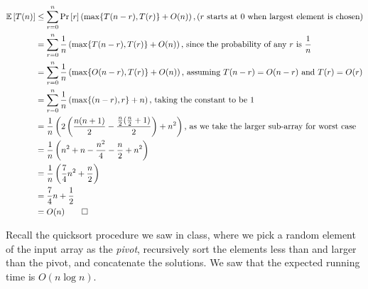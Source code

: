 \documentclass[addpoints]{exam}
\begin{document}
\begin{questions}
\begin{parts}
\begin{equation*}
\begin{aligned}
\mathbb{E} \left [ T(n) \right ] & \leq \sum_{r=0}^n \Pr \left [ r \right ] \left (\max\{ T(n-r), T(r) \} + O(n) \right ), \text{(} r \text{ starts at } 0 \text{ when largest element is chosen)}\\
&= \sum_{r=0}^n \frac{1}{n} \left (\max\{ T(n-r), T(r) \} + O(n) \right ) \text{, since the probability of any } r \text{ is } \frac{1}{n}\\
&= \sum_{r=0}^n \frac{1}{n} \left (\max\{ O(n-r), T(r) \} + O(n) \right ) \text{, assuming }T(n-r) = O(n-r) \text{ and } T(r)=O(r)\\
&= \sum_{r=0}^n \frac{1}{n} \left (\max\{(n-r), r \} + n \right )\text{, taking the constant to be } 1\\
&= \frac{1}{n} \left (2\left(\frac{n(n+1)}{2} - \frac{\frac{n}{2}(\frac{n}{2}+1)}{2} \right ) + n^2 \right ) \text{, as we take the larger sub-array for worst case}\\
&= \frac{1}{n} \left ( n^2 + n - \frac{n^2}{4} -\frac{n}{2} + n^2 \right )\\
&=\frac{1}{n} \left (\frac{7}{4} n^2  + \frac{n}{2} \right )\\
&= \frac{7}{4} n + \frac{1}{2} \\
&= O(n) \qed
\end{aligned}
\end{equation*}

\end{parts}

Recall the quicksort procedure we saw in class, where we pick a random element of the input array as the {\em pivot}, recursively sort the elements less than and larger than the pivot, and concatenate the solutions.  We saw that the expected running time is $O(n \log n)$.  

\end{questions}
\end{document}
